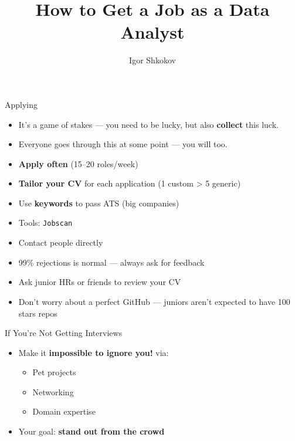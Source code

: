 \documentclass[10pt,a4paper]{article}
\title{How to Get a Job as a \textbf{Data Analyst}}
\author{Igor Shkokov}
\begin{document}
\small
\begin{multicols}{3}

\maketitle
\thispagestyle{empty}
\scriptsize
	
\begin{textbox}{Applying}

\begin{itemize}
    \item It's a game of stakes — you need to be lucky, but also \textbf{collect} this luck.
    \item Everyone goes through this at some point — you will too.
    \item \textbf{Apply often} (15–20 roles/week)
    \item \textbf{Tailor your CV} for each application (1 custom > 5 generic)
    \item Use \textbf{keywords} to pass ATS (big companies)
    \item Tools: \texttt{Jobscan}
    \item Contact people directly
    \item 99\% rejections is normal — always ask for feedback
    \item Ask junior HRs or friends to review your CV
    \item Don't worry about a perfect GitHub — juniors aren’t expected to have 100 stars repos
\end{itemize}

\end{textbox}

\begin{textboxGreen}{If You're Not Getting Interviews}
\begin{itemize}
    \item Make it \textbf{impossible to ignore you!} via:
    \begin{itemize}
        \item Pet projects
        \item Networking
        \item Domain expertise
    \end{itemize}
    \item Your goal: \textbf{stand out from the crowd}
\end{itemize}
\end{textboxGreen}


\end{multicols}
\end{document}
